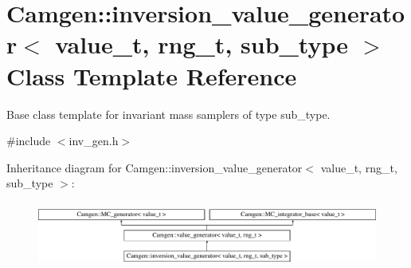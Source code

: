 \hypertarget{a00321}{}\section{Camgen\+:\+:inversion\+\_\+value\+\_\+generator$<$ value\+\_\+t, rng\+\_\+t, sub\+\_\+type $>$ Class Template Reference}
\label{a00321}


Base class template for invariant mass samplers of type sub\+\_\+type.  




{\ttfamily \#include $<$inv\+\_\+gen.\+h$>$}

Inheritance diagram for Camgen\+:\+:inversion\+\_\+value\+\_\+generator$<$ value\+\_\+t, rng\+\_\+t, sub\+\_\+type $>$\+:\begin{figure}[H]
\begin{center}
\leavevmode
\includegraphics[height=2.170543cm]{a00321}
\end{center}
\end{figure}
